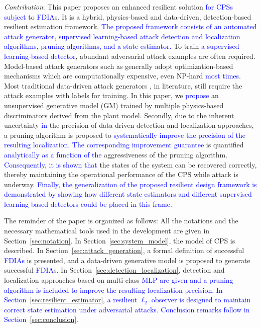\emph{Contribution}: This paper proposes an enhanced resilient solution \textcolor{blue}{for CPSs subject} to \textcolor{blue}{FDIA}s. It is a hybrid, physics-based and data-driven, detection-based resilient estimation framework. \textcolor{blue}{The proposed framework consists of an automated attack generator, supervised learning-based attack detection and localization algorithms, pruning algorithms, and a state estimator.} To train \textcolor{blue}{a supervised learning-based detector}, abundant adversarial attack examples are often required. Model-based attack generators such as \cite{zheng2021Resilient, yang2013false} generally adopt optimization-based mechanisms which are computationally expensive, even NP-hard \textcolor{blue}{most times}. Most traditional data-driven attack generators \cite{mohammadpourfard2020generation,ahmadian2018cyber}, in literature, still require the attack examples with labels for training. In this paper, we \textcolor{blue}{propose} an unsupervised generative model (GM) trained by multiple physics-based discriminators derived from the plant model. Secondly, due to the inherent uncertainty \textcolor{blue}{in} the precision of data-driven detection and localization approaches, a pruning algorithm is proposed to \textcolor{blue}{systematically improve the precision of the resulting localization. The corresponding improvement guarantee} is quantified \textcolor{blue}{analytically as a function of the} aggressiveness of the pruning algorithm. \textcolor{blue}{Consequently, it is shown that} the states of the system can be recovered correctly, thereby maintaining the operational performance of the CPS while attack is underway. \textcolor{blue}{Finally, the generalization of the proposed resilient design framework is demonstrated by showing how different state estimators and different supervised learning-based detectors could be placed in this frame.}


The reminder of the paper is organized as follows: All the notations and the necessary mathematical tools used in the development are given in Section~\ref{sec:notation}. In Section~\ref{sec:system_model}, the model of CPS is described. In Section~\ref{sec:attack_generation}, a formal definition of successful \textcolor{blue}{FDIAs} is presented, and a data-driven generative model is proposed to generate successful \textcolor{blue}{FDIA}s. In Section~\ref{sec:detection_localization}, detection and localization approaches based on multi-class \textcolor{blue}{ MLP are given and a pruning algorithm is included to improve the resulting localization precision. In Section~\ref{sec:resilient_estimator}, a resilient $\ell_2$ observer is designed to maintain correct state estimation under adversarial attacks. Conclusion remarks follow in Section~\ref{sec:conclusion}.}